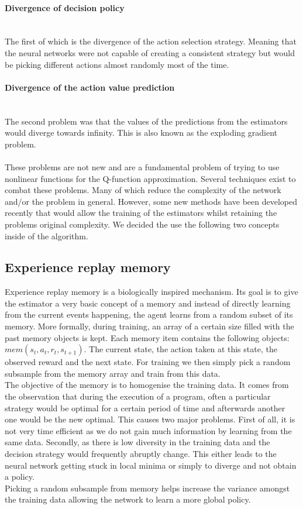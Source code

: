 \paragraph{Divergence of decision policy}\mbox{}\\
The first of which is the divergence of the action selection strategy. Meaning that the neural networks were not capable of creating a consistent strategy but would be picking different actions almost randomly most of the time.
\paragraph{Divergence of the action value prediction}\mbox{}\\
The second problem was that the values of the predictions from the estimators would diverge towards infinity. This is also known as the exploding gradient problem.\\
\mbox{}\\
These problems are not new and are a fundamental problem of trying to use nonlinear functions for the Q-function approximation. Several techniques exist to combat these problems. Many of which reduce the complexity of the network and/or the problem in general. However, some new methods have been developed recently that would allow the training of the estimators whilst retaining the problems original complexity. We decided the use the following two concepts inside of the algorithm.
\subsection{Experience replay memory}
Experience replay memory \cite{Mnih2015} is a biologically inspired mechanism. Its goal is to give the estimator a very basic concept of a memory and instead of directly learning from the current events happening, the agent learns from a random subset of its memory. More formally, during training, an array of a certain size filled with the past memory objects is kept. Each memory item contains the following objects: $mem(s_t, a_t, r_t, s_{t+1})$. The current state, the action taken at this state, the observed reward and the next state. For training we then simply pick a random subsample from the memory array and train from this data.
\\
The objective of the memory is to homogenise the training data. It comes from the observation that during the execution of a program, often a particular strategy would be optimal for a certain period of time and afterwards another one would be the new optimal. This causes two major problems. First of all, it is not very time efficient as we do not gain much information by learning from the same data. Secondly, as there is low diversity in the training data and the decision strategy would frequently abruptly change. This either leads to the neural network getting stuck in local minima or simply to diverge and not obtain a policy. \\
Picking a random subsample from memory helps increase the variance amongst the training data allowing the network to learn a more global policy. 


